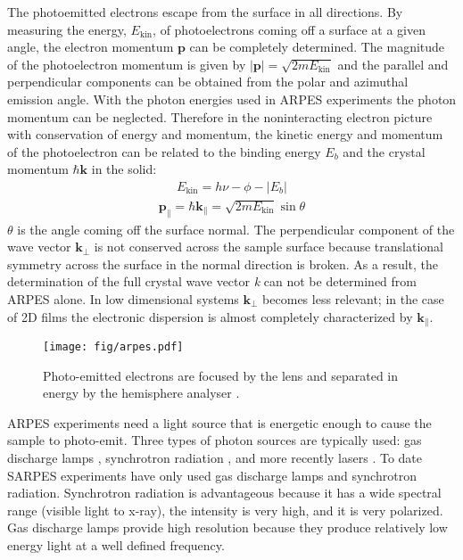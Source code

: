 \documentclass[12pt]{article}
\begin{document}
The photoemitted electrons escape from the surface in all directions.
By measuring the energy, $E_{\text{kin}}$, of photoelectrons coming off a surface at a given angle, the electron momentum $\boldsymbol{p}$ can be completely determined.
The magnitude of the photoelectron momentum is given by $|\boldsymbol{p}|=\sqrt{2mE_{\text{kin}}}$ and the parallel and perpendicular components can be obtained from the polar and azimuthal emission angle.
With the photon energies used in ARPES experiments the photon momentum can be neglected.
Therefore in the noninteracting electron picture with conservation of energy and momentum, the kinetic energy and momentum of the photoelectron can be related to the binding energy $E_b$ and the crystal momentum $\hbar\boldsymbol{k}$ in the solid\cite{Damascelli}:
\begin{align}
  E_{\text{kin}}=h\nu-\phi-|E_b|
\end{align}
\begin{align}
  \boldsymbol{p_{\parallel}}=\hbar\boldsymbol{k_{\parallel}}=\sqrt{2mE_{\text{kin}}}\sin\theta
\end{align}
$\theta$ is the angle coming off the surface normal.
The perpendicular component of the wave vector $\boldsymbol{k_{\perp}}$ is not conserved across the sample surface because translational symmetry across the surface in the normal direction is broken.  
As a result, the determination of the full crystal wave vector \emph{k} can not be determined from ARPES alone.
In low dimensional systems $\boldsymbol{k_{\perp}}$ becomes less relevant; in the case of 2D films the electronic dispersion is almost completely characterized by $\boldsymbol{k_{\parallel}}$.

\begin{figure}[h]
  \centering
  \texttt{[image: fig/arpes.pdf]}
  \caption{Photo-emitted electrons are focused by the lens and separated in energy by the hemisphere analyser \cite{Damascelli}.}
  \label{fig:arpes}
\end{figure}
ARPES experiments need a light source that is energetic enough to cause the sample to photo-emit.
Three types of photon sources are typically used:  gas discharge lamps \cite{Damascelli}, synchrotron radiation \cite{Damascelli}, and more recently lasers \cite{Dessau}.
To date SARPES experiments have only used gas discharge lamps and synchrotron radiation.
Synchrotron radiation is advantageous because it has a wide spectral range (visible light to x-ray), the intensity is very high, and it is very polarized.
Gas discharge lamps provide high resolution because they produce relatively low energy light at a well defined frequency.
\end{document}
